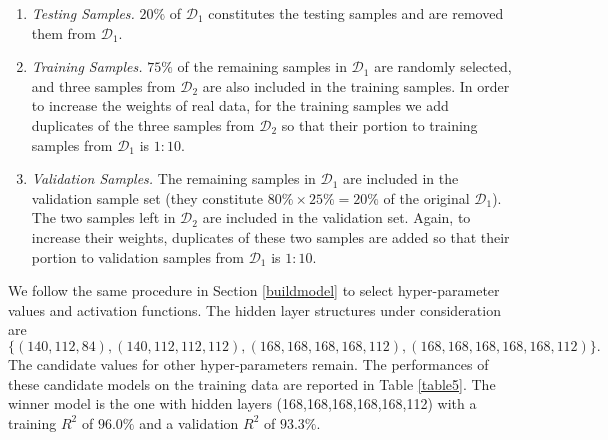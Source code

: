 \documentclass[thmsa,onecolumn,12pt]{article}%
\begin{document}
\begin{enumerate}
\item \textit{Testing Samples.} $20\%$ of $\mathcal{D}_1$ constitutes the testing samples and are removed them from $\mathcal{D}_1$.

\item \textit{Training Samples.} $75\%$ of the remaining samples in $\mathcal{D}_1$ are randomly selected, and three samples from $\mathcal{D}_2$ are also included in the training samples. In order to increase the weights of real data, for the training samples we add duplicates of the three samples from $\mathcal{D}_2$ so that their portion to training samples from $\mathcal{D}_1$ is $1:10$.

\item \textit{Validation Samples.} The remaining samples in $\mathcal{D}_1$ are included in the validation sample set (they constitute $80\%\times25\%=20\%$ of the original $\mathcal{D}_1$). The two samples left in $\mathcal{D}_2$ are included in the validation set. Again, to increase their weights, duplicates of these two samples are added so that their portion to validation samples from $\mathcal{D}_1$ is $1:10$.
\end{enumerate}


We follow the same procedure in Section \ref{buildmodel} to select hyper-parameter values and activation functions. The hidden layer structures under consideration are $$\{ (140,112,84), (140,112,112,112), (168,168,168,168,112),(168,168,168,168,168,112)  \}.$$
The candidate values for other hyper-parameters remain. The performances of these candidate models on the training data are reported in Table \ref{table5}. The winner model is the one with hidden layers (168,168,168,168,168,112) with a training $R^2$ of $96.0\%$ and a validation $R^2$ of $93.3\%$.
\end{document}
